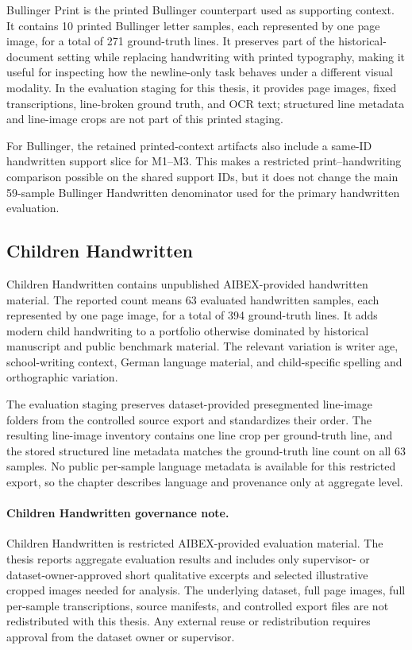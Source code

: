 Bullinger Print is the printed Bullinger counterpart used as supporting context. It contains 10 printed Bullinger letter samples, each represented by one page image, for a total of 271 ground-truth lines. It preserves part of the historical-document setting while replacing handwriting with printed typography, making it useful for inspecting how the newline-only task behaves under a different visual modality. In the evaluation staging for this thesis, it provides page images, fixed transcriptions, line-broken ground truth, and OCR text; structured line metadata and line-image crops are not part of this printed staging.

For Bullinger, the retained printed-context artifacts also include a same-ID handwritten support slice for M1--M3. This makes a restricted print--handwriting comparison possible on the shared support IDs, but it does not change the main 59-sample Bullinger Handwritten denominator used for the primary handwritten evaluation.

\subsection{Children Handwritten}
\label{sec:data_children}

Children Handwritten contains unpublished AIBEX-provided handwritten material. The reported count means 63 evaluated handwritten samples, each represented by one page image, for a total of 394 ground-truth lines. It adds modern child handwriting to a portfolio otherwise dominated by historical manuscript and public benchmark material. The relevant variation is writer age, school-writing context, German language material, and child-specific spelling and orthographic variation.

The evaluation staging preserves dataset-provided presegmented line-image folders from the controlled source export and standardizes their order. The resulting line-image inventory contains one line crop per ground-truth line, and the stored structured line metadata matches the ground-truth line count on all 63 samples. No public per-sample language metadata is available for this restricted export, so the chapter describes language and provenance only at aggregate level.

\paragraph{Children Handwritten governance note.}
Children Handwritten is restricted AIBEX-provided evaluation material. The thesis reports aggregate evaluation results and includes only supervisor- or dataset-owner-approved short qualitative excerpts and selected illustrative cropped images needed for analysis. The underlying dataset, full page images, full per-sample transcriptions, source manifests, and controlled export files are not redistributed with this thesis. Any external reuse or redistribution requires approval from the dataset owner or supervisor.

